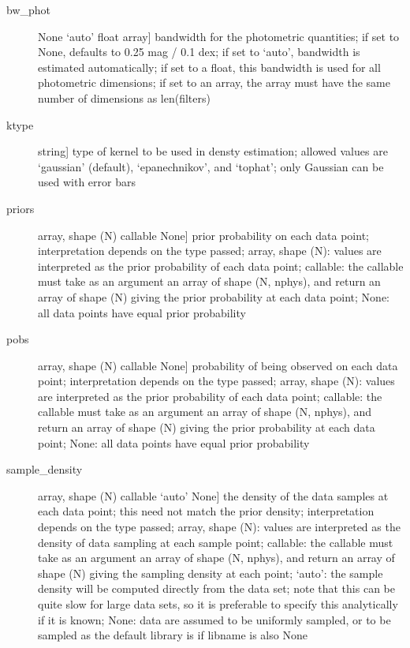 \documentclass[letterpaper,10pt,english]{sphinxmanual}
\begin{document}
\begin{fulllineitems}
\begin{fulllineitems}
\begin{description}
\begin{description}
\item[{bw\_phot}] \leavevmode{[}None \textbar{} ‘auto’ \textbar{} float \textbar{} array{]}
bandwidth for the photometric quantities; if set to
None, defaults to 0.25 mag / 0.1 dex; if set to ‘auto’,
bandwidth is estimated automatically; if set to a float,
this bandwidth is used for all photometric dimensions;
if set to an array, the array must have the same number
of dimensions as len(filters)

\item[{ktype}] \leavevmode{[}string{]}
type of kernel to be used in densty estimation; allowed
values are ‘gaussian’ (default), ‘epanechnikov’, and
‘tophat’; only Gaussian can be used with error bars

\item[{priors}] \leavevmode{[}array, shape (N) \textbar{} callable \textbar{} None{]}
prior probability on each data point; interpretation
depends on the type passed; array, shape (N): values are
interpreted as the prior probability of each data point;
callable: the callable must take as an argument an array
of shape (N, nphys), and return an array of shape (N)
giving the prior probability at each data point; None:
all data points have equal prior probability

\item[{pobs}] \leavevmode{[}array, shape (N) \textbar{} callable \textbar{} None{]}
probability of being observed on each data point; interpretation
depends on the type passed; array, shape (N): values are
interpreted as the prior probability of each data point;
callable: the callable must take as an argument an array
of shape (N, nphys), and return an array of shape (N)
giving the prior probability at each data point; None:
all data points have equal prior probability

\item[{sample\_density}] \leavevmode{[}array, shape (N) \textbar{} callable \textbar{} ‘auto’ \textbar{} None{]}
the density of the data samples at each data point; this
need not match the prior density; interpretation depends
on the type passed; array, shape (N): values are
interpreted as the density of data sampling at each
sample point; callable: the callable must take as an
argument an array of shape (N, nphys), and return an
array of shape (N) giving the sampling density at each
point; ‘auto’: the sample density will be computed
directly from the data set; note that this can be quite
slow for large data sets, so it is preferable to specify
this analytically if it is known; None: data are assumed
to be uniformly sampled, or to be sampled as the default
library is if libname is also None


\end{description}
\end{description}
\end{fulllineitems}
\end{fulllineitems}
\end{document}
